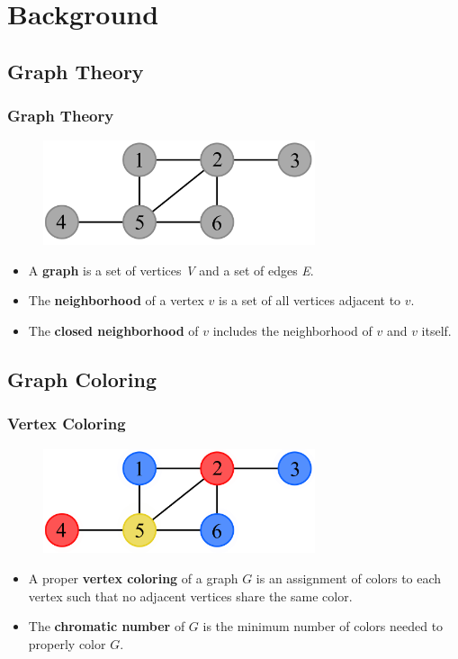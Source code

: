 \documentclass[xcolor=dvipsnames,aspectratio=1610]{beamer}
\begin{document}
  \section{Background}

  \subsection{Graph Theory}

  \begin{frame}
    \frametitle{Graph Theory}

    \begin{figure}[h]
      \centering
      \includegraphics[width=8cm]{../figures/example.pdf}
    \end{figure}

    \vfill

    \begin{itemize}
      \item A \textbf{graph} is a set of vertices \emph{V} and a set of edges \emph{E}.
      \item The \textbf{neighborhood} of a vertex $v$ is a set of all vertices adjacent to $v$.
      \item The \textbf{closed neighborhood} of $v$ includes the neighborhood of $v$ and $v$ itself.
    \end{itemize}
  \end{frame}

  \subsection{Graph Coloring}

  \begin{frame}
    \frametitle{Vertex Coloring}

    \begin{figure}[h]
      \centering
      \includegraphics[width=8cm]{../figures/example-vcp.pdf}
    \end{figure}

    \vfill

    \begin{itemize}
      \item A proper \textbf{vertex coloring} of a graph $G$ is an assignment of colors to each vertex such that no adjacent vertices share the same color.
      \item The \textbf{chromatic number} of $G$ is the minimum number of colors needed to properly color $G$.
    \end{itemize}
  \end{frame}
\end{document}
